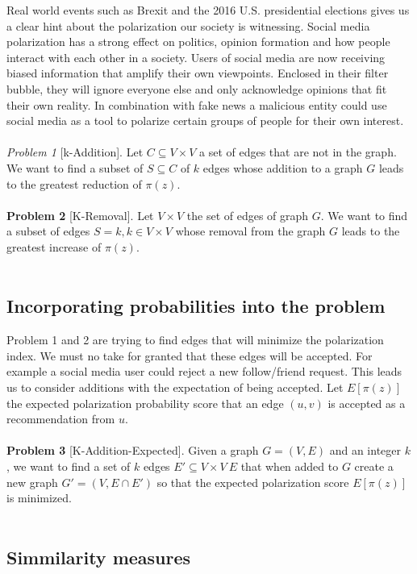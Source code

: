 Real world events such as Brexit and the 2016 U.S. presidential elections gives us a clear hint about the polarization our society is witnessing. Social media polarization has a strong effect on politics, opinion formation and how people interact with each other in a society. Users of social media are now receiving biased information that amplify their own viewpoints. Enclosed in their filter bubble, they will ignore everyone else and only acknowledge opinions that fit their own reality. In combination with fake news a malicious entity could use social media as a tool to polarize certain groups of people for their own interest. 
\\
\\
\textit{Problem 1} [k-Addition]. Let $C \subseteq	V \times V$ a set of edges that are not in the graph. We want to find a subset of $S \subseteq C$ of $k$ edges whose addition to a graph $G$ leads to the greatest reduction of $\pi(z)$.
\\
\\
\textbf{Problem 2} [K-Removal]. Let $V \times V$ the set of edges of graph $G$. We want to find a subset of edges $S = k, k \in V \times V$   whose removal from the graph $G$ leads to the greatest increase of $\pi(z)$.
\\
\\
\clearpage

\subsection{Incorporating probabilities into the problem}
\label{sec:probabilityProbDef}

Problem 1 and 2 are trying to find edges that will minimize the polarization index. We must no take for granted that these edges will be accepted. For example a social media user could reject a new follow/friend request. This leads us to consider additions with the expectation of being accepted. Let $E[\pi(z)]$ the expected polarization probability score that an edge $(u, v)$ is accepted as a recommendation from $u$.
\\
\\
\textbf{Problem 3} [K-Addition-Expected]. Given a graph $G=(V,E)$ and an integer $k$, we want to find a set of $k$ edges $E′ \subseteq V×V \ E$ that when added to $G$ create a new graph $G' = (V,E \cap E')$ so that the expected polarization score $E[\pi(z)]$ is minimized.
\\
\\

\subsection{Simmilarity measures}
\label{sec:simMeasures}

